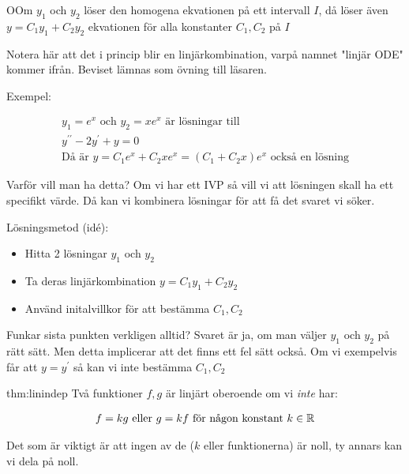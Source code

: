 \begin{theo}
  OOm $y_1$ och $y_2$ löser den homogena ekvationen på ett intervall $I$, då löser även $y=C_1y_1+C_2y_2$ ekvationen för alla konstanter $C_1, C_2$ på $I$
\end{theo}
\par\bigskip
\noindent Notera här att det i princip blir en linjärkombination, varpå namnet "linjär ODE" kommer ifrån. Beviset lämnas som övning till läsaren.

\noindent Exempel:

\begin{equation*}
  \begin{gathered}
    y_1=e^x \text{ och } y_2=xe^x \text{ är lösningar till}\\y^{\prime\prime}-2y^{\prime}+y=0\\
    \text{Då är } y= C_1e^x+C_2xe^x = (C_1+C_2x)e^x \text{ också en lösning}
  \end{gathered}
\end{equation*}
\par\bigskip

\noindent Varför vill man ha detta? Om vi har ett IVP så vill vi att lösningen skall ha ett specifikt värde. Då kan vi kombinera lösningar för att få det svaret vi söker.
\par\bigskip

\noindent Lösningsmetod (idé):

\begin{itemize}
  \item Hitta 2 lösningar $y_1$ och $y_2$
  \item Ta deras linjärkombination $y=C_1y_1+C_2y_2$
  \item Använd initalvillkor för att bestämma $C_1, C_2$
\end{itemize}

\noindent Funkar sista punkten verkligen alltid? Svaret är ja, om man väljer $y_1$ och $y_2$ på rätt sätt. Men detta implicerar att det finns ett fel sätt också. Om vi exempelvis får att $y=y^{\prime}$ så kan vi inte bestämma $C_1, C_2$ 
\par\bigskip
\pagebreak

\begin{theo}{thm:linindep}
  Två funktioner $f,g$ är linjärt oberoende om vi \textit{inte} har:

  \begin{equation*}
    \begin{gathered}
      f = kg \text{ eller } g=kf \text{ för någon konstant } k\in\mathbb{R}
    \end{gathered}
  \end{equation*}
  \par\bigskip
  \noindent Det som är viktigt är att ingen av de ($k$ eller funktionerna) är noll, ty annars kan vi dela på noll.
\end{theo}
\par\bigskip

